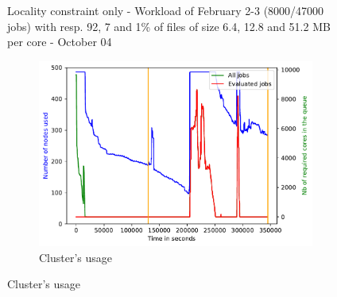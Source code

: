 \documentclass[a4paper]{article}
\begin{document}
\begin{figure}[H]
\caption{Locality constraint only - Workload of February 2-3 (8000/47000 jobs) with resp. 92, 7 and 1\% of files of size 6.4, 12.8 and 51.2 MB per core - October 04}\end{figure}

\begin{figure}[H]\centering
\begin{subfigure}[b]{0.4\linewidth}\centering\includegraphics[width=1\linewidth]{MBSS/plot/2022-04-07->2022-04-09_V9271_Fcfs_Used_nodes_450_128_32_256_4_1024.pdf}\caption{Cluster's usage}\end{subfigure}

\end{figure}
\end{document}
